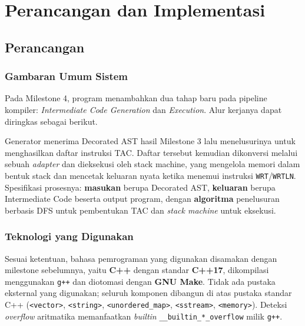 \section{Perancangan dan Implementasi}

\subsection{Perancangan}

\subsubsection{Gambaran Umum Sistem}

Pada Milestone 4, program menambahkan dua tahap baru pada pipeline kompiler:
\emph{Intermediate Code Generation} dan \emph{Execution}. Alur kerjanya dapat
diringkas sebagai berikut.

\begin{center}
\end{center}

Generator menerima Decorated AST hasil Milestone 3 lalu menelusurinya untuk
menghasilkan daftar instruksi TAC. Daftar tersebut kemudian dikonversi melalui
sebuah \emph{adapter} dan dieksekusi oleh stack machine, yang mengelola memori
dalam bentuk stack dan mencetak keluaran nyata ketika menemui instruksi
\texttt{WRT}/\texttt{WRTLN}. Spesifikasi prosesnya: \textbf{masukan} berupa
Decorated AST, \textbf{keluaran} berupa Intermediate Code beserta output program,
dengan \textbf{algoritma} penelusuran berbasis DFS untuk pembentukan TAC dan
\emph{stack machine} untuk eksekusi.

\subsubsection{Teknologi yang Digunakan}

Sesuai ketentuan, bahasa pemrograman yang digunakan disamakan dengan milestone
sebelumnya, yaitu \textbf{C++} dengan standar \textbf{C++17}, dikompilasi
menggunakan \texttt{g++} dan diotomasi dengan \textbf{GNU Make}. Tidak ada
pustaka eksternal yang digunakan; seluruh komponen dibangun di atas pustaka
standar C++ (\texttt{<vector>}, \texttt{<string>}, \texttt{<unordered\_map>},
\texttt{<sstream>}, \texttt{<memory>}). Deteksi \emph{overflow} aritmatika
memanfaatkan \emph{builtin} \texttt{\_\_builtin\_*\_overflow} milik \texttt{g++}.

